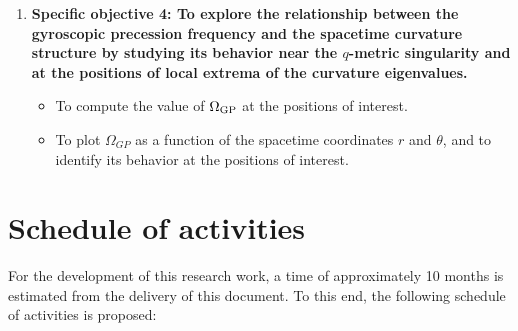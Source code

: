 \documentclass[12pt]{article}
\newcommand{\A}[1]{\bf A#1}              %
\begin{document}
\begin{enumerate}
	\item {\bf Specific objective 4: To explore the relationship between the gyroscopic precession frequency and the spacetime curvature structure by studying its behavior near the $q$-metric singularity and at the positions of local extrema of the curvature eigenvalues.}
	\begin{itemize}
		\item[\A{9}] To compute the value of $\Omega_{\rm GP}$ at the positions of interest.
		\item[\A{10}] To plot $\Omega_{GP}$ as a function of the spacetime coordinates $r$ and $\theta$, and to identify its behavior at the positions of interest.
	\end{itemize} 	
\end{enumerate}

\section{Schedule of activities}
For the development of this research work, a time of approximately 10 months is estimated from the delivery of this document. To this end, the following schedule of activities is
proposed:
\end{document}
